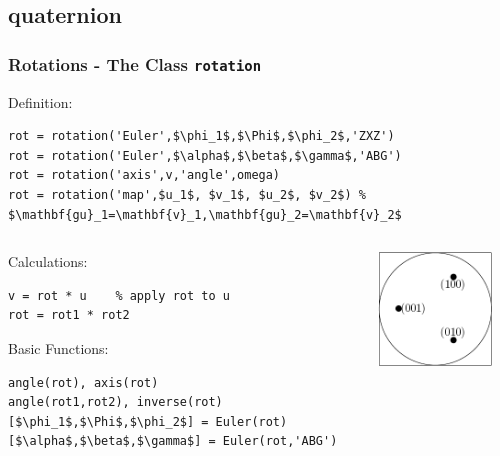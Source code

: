 \subsection*{quaternion}


\begin{frame}[fragile]
  \frametitle{Rotations - The \MTEX Class \texttt{\bf rotation}}

Definition:

\begin{lstlisting}[mathescape=true]
rot = rotation('Euler',$\phi_1$,$\Phi$,$\phi_2$,'ZXZ')
rot = rotation('Euler',$\alpha$,$\beta$,$\gamma$,'ABG')
rot = rotation('axis',v,'angle',omega)
rot = rotation('map',$u_1$, $v_1$, $u_2$, $v_2$) % $\mathbf{gu}_1=\mathbf{v}_1,\mathbf{gu}_2=\mathbf{v}_2$
\end{lstlisting}

\begin{columns}
  \begin{column}{8.5cm}

    Calculations:

\begin{lstlisting}
v = rot * u    % apply rot to u
rot = rot1 * rot2
\end{lstlisting}

    Basic Functions:

\begin{lstlisting}[mathescape=true]
angle(rot), axis(rot)
angle(rot1,rot2), inverse(rot)
[$\phi_1$,$\Phi$,$\phi_2$] = Euler(rot)
[$\alpha$,$\beta$,$\gamma$] = Euler(rot,'ABG')
\end{lstlisting}

  \end{column}

  \begin{column}{3cm}
    \includegraphics[width=3cm]{pic/quaternion}
  \end{column}

\end{columns}
\end{frame}



